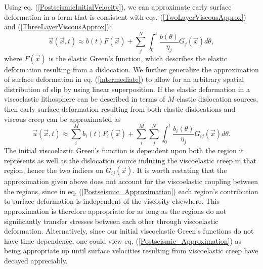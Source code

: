 \documentclass[extra,mreferee]{gji}
\begin{document}
Using eq. (\ref{PostseismicInitialVelocity}), we can approximate
early surface deformation in a form that is consistent with
eqs. (\ref{TwoLayerViscousApprox}) and
(\ref{ThreeLayerViscousApprox}):
\begin{equation}\label{intermediate}
\vec{u}(\vec{x},t) \approx b(t)F(\vec{x}) + \sum_j^N\int_0^t
\frac{b(\theta)}{\eta_j}G_j(\vec{x}) d\theta,
\end{equation}
where $F(\vec{x})$ is the elastic Green's function, which describes the
elastic deformation resulting from a dislocation.  We further
generalize the approximation of surface deformation in
eq. (\ref{intermediate}) to allow for an arbitrary spatial
distribution of slip by using linear superposition.  If the elastic
deformation in a viscoelastic lithosphere can be described in terms of
$M$ elastic dislocation sources, then early surface deformation
resulting from both elastic dislocations and viscous creep can be
approximated as 
\begin{equation}\label{Postseismic_Approximation}
\vec{u}(\vec{x},t) \approx \sum_i^Mb_i(t)F_i(\vec{x}) +
\sum_i^M\sum_j^N\int_0^t\frac{b_i(\theta)}{\eta_j}G_{ij}(\vec{x}) d\theta.
\end{equation}
The initial viscoelastic Green's function is dependent upon both the
region it represents as well as the dislocation source inducing the
viscoelastic creep in that region, hence the two indices on
$G_{ij}(\vec{x})$.  It is worth restating that the approximation given
above does not account for the viscoelastic coupling between the
regions, since in eq. (\ref{Postseismic_Approximation}) each region's
contribution to surface deformation is independent of the viscosity
elsewhere.  This approximation is therefore appropriate for as long as
the regions do not significantly transfer stresses between each other
through viscoelastic deformation.  Alternatively, since our initial
viscoelastic Green's functions do not have time dependence, one could
view eq. (\ref{Postseismic_Approximation}) as being appropriate up
until surface velocities resulting from viscoelastic creep have
decayed appreciably.
\end{document}
